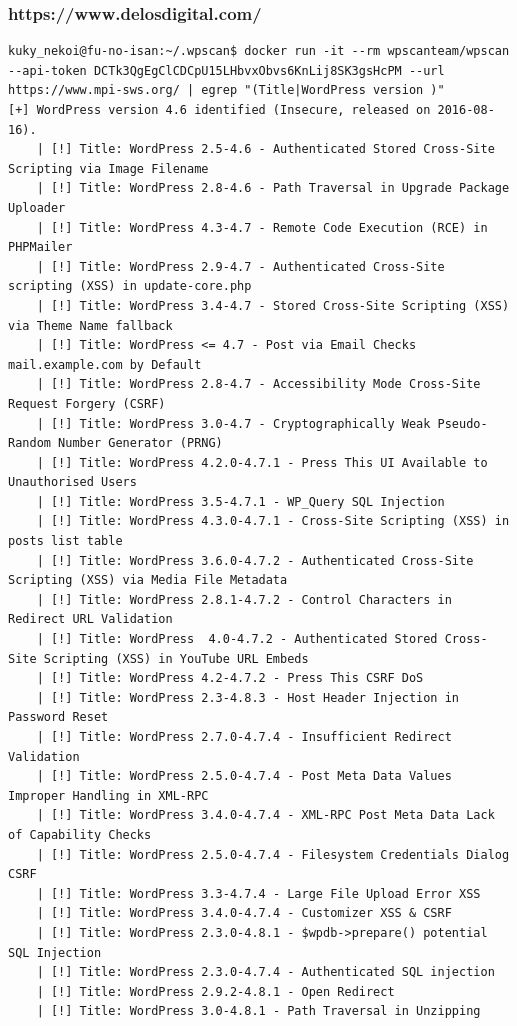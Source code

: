 \documentclass[11pt]{utalcaDoc}
\begin{document}
\subsubsection{https://www.delosdigital.com/}
\begin{verbatim}
kuky_nekoi@fu-no-isan:~/.wpscan$ docker run -it --rm wpscanteam/wpscan --api-token DCTk3QgEgClCDCpU15LHbvxObvs6KnLij8SK3gsHcPM --url https://www.mpi-sws.org/ | egrep "(Title|WordPress version )"
[+] WordPress version 4.6 identified (Insecure, released on 2016-08-16).
	| [!] Title: WordPress 2.5-4.6 - Authenticated Stored Cross-Site Scripting via Image Filename
	| [!] Title: WordPress 2.8-4.6 - Path Traversal in Upgrade Package Uploader
	| [!] Title: WordPress 4.3-4.7 - Remote Code Execution (RCE) in PHPMailer
	| [!] Title: WordPress 2.9-4.7 - Authenticated Cross-Site scripting (XSS) in update-core.php
	| [!] Title: WordPress 3.4-4.7 - Stored Cross-Site Scripting (XSS) via Theme Name fallback
	| [!] Title: WordPress <= 4.7 - Post via Email Checks mail.example.com by Default
	| [!] Title: WordPress 2.8-4.7 - Accessibility Mode Cross-Site Request Forgery (CSRF)
	| [!] Title: WordPress 3.0-4.7 - Cryptographically Weak Pseudo-Random Number Generator (PRNG)
	| [!] Title: WordPress 4.2.0-4.7.1 - Press This UI Available to Unauthorised Users
	| [!] Title: WordPress 3.5-4.7.1 - WP_Query SQL Injection
	| [!] Title: WordPress 4.3.0-4.7.1 - Cross-Site Scripting (XSS) in posts list table
	| [!] Title: WordPress 3.6.0-4.7.2 - Authenticated Cross-Site Scripting (XSS) via Media File Metadata
	| [!] Title: WordPress 2.8.1-4.7.2 - Control Characters in Redirect URL Validation
	| [!] Title: WordPress  4.0-4.7.2 - Authenticated Stored Cross-Site Scripting (XSS) in YouTube URL Embeds
	| [!] Title: WordPress 4.2-4.7.2 - Press This CSRF DoS
	| [!] Title: WordPress 2.3-4.8.3 - Host Header Injection in Password Reset
	| [!] Title: WordPress 2.7.0-4.7.4 - Insufficient Redirect Validation
	| [!] Title: WordPress 2.5.0-4.7.4 - Post Meta Data Values Improper Handling in XML-RPC
	| [!] Title: WordPress 3.4.0-4.7.4 - XML-RPC Post Meta Data Lack of Capability Checks 
	| [!] Title: WordPress 2.5.0-4.7.4 - Filesystem Credentials Dialog CSRF
	| [!] Title: WordPress 3.3-4.7.4 - Large File Upload Error XSS
	| [!] Title: WordPress 3.4.0-4.7.4 - Customizer XSS & CSRF
	| [!] Title: WordPress 2.3.0-4.8.1 - $wpdb->prepare() potential SQL Injection
	| [!] Title: WordPress 2.3.0-4.7.4 - Authenticated SQL injection
	| [!] Title: WordPress 2.9.2-4.8.1 - Open Redirect
	| [!] Title: WordPress 3.0-4.8.1 - Path Traversal in Unzipping

\end{verbatim}
\end{document}
